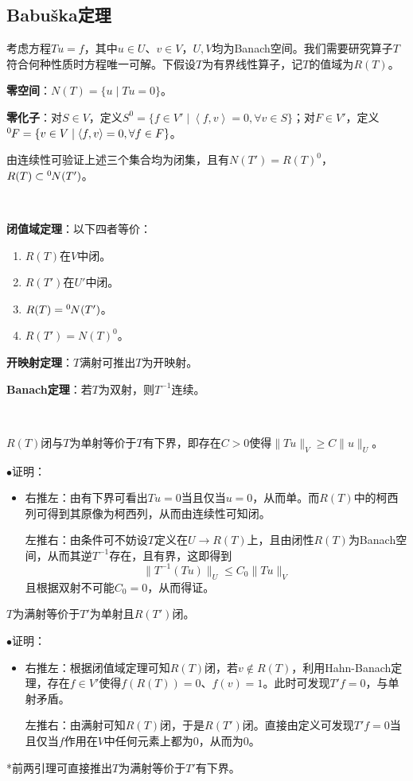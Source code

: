 \documentclass[a4paper,UTF8,fontset=windows]{ctexart}
\newcommand*{\uz}{{}^0\hspace{-0.07em}}
\newcommand{\proo}[1]{{\kaishu $\bullet$证明：
\begin{itemize}
    \item[] #1
\end{itemize}
}}
\begin{document}
\subsection{Babu\v ska定理}
考虑方程$Tu=f$，其中$u\in U$、$v\in V$，$U,V$均为Banach空间。我们需要研究算子$T$符合何种性质时方程唯一可解。下假设$T$为有界线性算子，记$T$的值域为$R(T)$。

\textbf{零空间}：$N(T)=\{u\mid Tu=0\}$。

\textbf{零化子}：对$S\in V$，定义$S^0=\{f\in V'\mid\left<f,v\right>=0,\forall v\in S\}$；对$F\in V'$，定义$\uz{F}=\{v\in V\mid\left<f,v\right>=0,\forall f\in F\}$。

由连续性可验证上述三个集合均为闭集，且有$N(T')=R(T)^0$，$R(T)\subset \uz N(T')$。

\

\textbf{闭值域定理}：以下四者等价：
\begin{enumerate}
    \item $R(T)$在$V$中闭。
    \item $R(T')$在$U'$中闭。
    \item $R(T)=\uz N(T')$。
    \item $R(T')=N(T)^0$。
\end{enumerate}

\textbf{开映射定理}：$T$满射可推出$T$为开映射。

\textbf{Banach定理}：若$T$为双射，则$T^{-1}$连续。

\

$R(T)$闭与$T$为单射等价于$T$有下界，即存在$C>0$使得$\|Tu\|_V\ge C\|u\|_U$。

\proo{
    右推左：由有下界可看出$Tu=0$当且仅当$u=0$，从而单。而$R(T)$中的柯西列可得到其原像为柯西列，从而由连续性可知闭。

    左推右：由条件可不妨设$T$定义在$U\to R(T)$上，且由闭性$R(T)$为Banach空间，从而其逆$T^{-1}$存在，且有界，这即得到
    $$\|T^{-1}(Tu)\|_U\le C_0\|Tu\|_V$$
    且根据双射不可能$C_0=0$，从而得证。
}

$T$为满射等价于$T'$为单射且$R(T')$闭。

\proo{
    右推左：根据闭值域定理可知$R(T)$闭，若$v\notin R(T)$，利用Hahn-Banach定理，存在$f\in V'$使得$f(R(T))=0$、$f(v)=1$。此时可发现$T'f=0$，与单射矛盾。

    左推右：由满射可知$R(T)$闭，于是$R(T')$闭。直接由定义可发现$T'f=0$当且仅当$f$作用在$V$中任何元素上都为0，从而为0。
}

*前两引理可直接推出$T$为满射等价于$T'$有下界。

\
\end{document}
